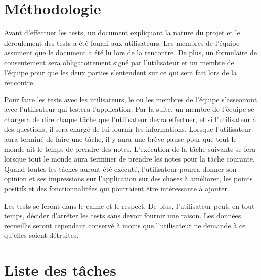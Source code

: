 \documentclass[letterpaper, oneside, 12pt, these, creativecommons]{thETS}
\begin{document}
\section{Méthodologie}

Avant d'effectuer les tests, un document expliquant la nature du projet et le déroulement des tests a été fourni aux utilisateurs. Les membres de l'équipe assument que le document a été lu lors de la rencontre. De plus, un formulaire de consentement sera obligatoirement signé par l'utilisateur et un membre de l'équipe pour que les deux parties s'entendent sur ce qui sera fait lors de la rencontre.

Pour faire les tests avec les utilisateurs, le ou les membres de l'équipe s'asseoiront avec l'utilisateur qui testera l'application. Par la suite, un membre de l'équipe se chargera de dire chaque tâche que l'utilisateur devra effectuer, et si l'utilisateur à des questions, il sera chargé de lui fournir les informations. Lorsque l'utilisateur aura terminé de faire une tâche, il y aura une brève pause pour que tout le monde ait le temps de prendre des notes. L'exécution de la tâche suivante se fera lorsque tout le monde aura terminer de prendre les notes pour la tâche courante. Quand toutes les tâches auront été exécuté, l'utilisateur pourra donner son opinion et ses impressions sur l'application sur des choses à améliorer, les points positifs et des fonctionnalitées qui pourraient être intéressante à ajouter.

Les tests se feront dans le calme et le respect. De plus, l'utilisateur peut, en tout temps, décider d'arrêter les tests sans devoir fournir une raison. Les données recueillis seront cependant conservé à moins que l'utilisateur ne demande à ce qu'elles soient détruites.

\newpage

\section{Liste des tâches}
\end{document}
